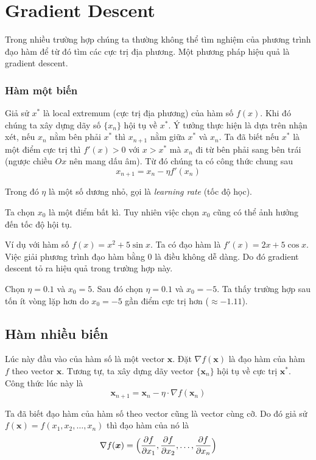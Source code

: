 \section*{Gradient Descent}

Trong nhiều trường hợp chúng ta thường không thể tìm nghiệm của phương trình đạo hàm để từ đó tìm các cực trị địa phương. Một phương pháp hiệu quả là gradient descent.

\subsubsection*{Hàm một biến}

Giả sử $x^*$ là local extremum (cực trị địa phương) của hàm số $f(x)$. Khi đó chúng ta xây dựng dãy số $\{ x_n \}$ hội tụ về $x^*$. Ý tưởng thực hiện là dựa trên nhận xét, nếu $x_n$ nằm bên phải $x^*$ thì $x_{n+1}$ nằm giữa $x^*$ và $x_n$. Ta đã biết nếu $x^*$ là một điểm cực trị thì $f'(x) > 0$ với $x > x^*$ mà $x_n$ đi từ bên phải sang bên trái (ngược chiều $Ox$ nên mang dấu âm). Từ đó chúng ta có công thức chung sau \[x_{n+1} = x_n - \eta f'(x_n)\]

Trong đó $\eta$ là một số dương nhỏ, gọi là \textit{learning rate} (tốc độ học).

Ta chọn $x_0$ là một điểm bất kì. Tuy nhiên việc chọn $x_0$ cũng có thể ảnh hưởng đến tốc độ hội tụ.

Ví dụ với hàm số $f(x) = x^2 + 5 \sin x$. Ta có đạo hàm là $f'(x) = 2x + 5 \cos x$. Việc giải phương trình đạo hàm bằng 0 là điều không dễ dàng. Do đó gradient descent tỏ ra hiệu quả trong trường hợp này.

Chọn $\eta = 0.1$ và $x_0 = 5$. Sau đó chọn $\eta = 0.1$ và $x_0 = -5$. Ta thấy trường hợp sau tốn ít vòng lặp hơn do $x_0 = -5$ gần điểm cực trị hơn ($\approx -1.11$).

\subsection*{Hàm nhiều biến}

Lúc này đầu vào của hàm số là một vector $\bm{x}$. Đặt $\nabla f(\bm{x})$ là đạo hàm của hàm $f$ theo vector $\bm{x}$. Tương tự, ta xây dựng dãy vector $\{ \bm{x}_n \}$ hội tụ về cực trị $\bm{x}^*$. Công thức lúc này là \[\bm{x}_{n+1} = \bm{x}_n - \eta \cdot \nabla f(\bm{x}_n)\]

Ta đã biết đạo hàm của hàm số theo vector cũng là vector cùng cỡ. Do đó giả sử $f(\bm{x}) = f(x_1, x_2, \ldots, x_n)$ thì đạo hàm của nó là \[\nabla f(\bm{x}) = \Bigl( \dfrac{\partial f}{\partial x_1}, \dfrac{\partial f}{\partial x_2}, \ldots, \dfrac{\partial f}{\partial x_n}\Bigr)\]


